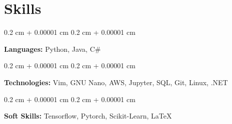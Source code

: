 \documentclass[10pt, letterpaper]{article}
\newenvironment{onecolentry}{
    \begin{adjustwidth}{
        0.2 cm + 0.00001 cm
    }{
        0.2 cm + 0.00001 cm
    }
}{
    \end{adjustwidth}
} %
\begin{document}
    \section{Skills}
    \begin{onecolentry}
        \textbf{Languages:} Python, Java, C\#
    \end{onecolentry}

    \vspace{0.2 cm}

    \begin{onecolentry}
        \textbf{Technologies:} Vim, GNU Nano, AWS, Jupyter, SQL, Git, Linux, .NET
    \end{onecolentry}
    \vspace{0.2 cm}
        \begin{onecolentry}
        \textbf{Soft Skills:} Tensorflow, Pytorch, Scikit-Learn, LaTeX
    \end{onecolentry}
\end{document}
